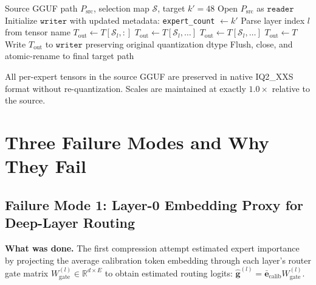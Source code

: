 \documentclass[final]{article}
\newcommand{\MAPLE}{\textsc{MAPLE}}
\newcommand{\R}{\mathbb{R}}
\begin{document}
\begin{algorithm}[H]
\caption{\MAPLE{} Container Assembly}
\begin{algorithmic}[1]
\Require Source GGUF path $P_\text{src}$, selection map $\mathcal{S}$, target $k' = 48$
\State Open $P_\text{src}$ as $\texttt{reader}$
\State Initialize $\texttt{writer}$ with updated metadata: \texttt{expert\_count} $\leftarrow k'$
  \State Parse layer index $l$ from tensor name
    \State $T_\text{out} \leftarrow T[\mathcal{S}_l, :]$ 
    \State $T_\text{out} \leftarrow T[\mathcal{S}_l, \ldots]$ 
    \State $T_\text{out} \leftarrow T[\mathcal{S}_l, \ldots]$ 
  \Else
    \State $T_\text{out} \leftarrow T$ 
  \EndIf
  \State Write $T_\text{out}$ to $\texttt{writer}$ preserving original quantization dtype
\EndFor
\State Flush, close, and atomic-rename to final target path
\end{algorithmic}
\end{algorithm}

All per-expert tensors in the source GGUF are preserved in native IQ2\_XXS format without re-quantization. Scales are maintained at exactly $1.0\times$ relative to the source.

\section{Three Failure Modes and Why They Fail}
\label{sec:failures}

\subsection{Failure Mode 1: Layer-0 Embedding Proxy for Deep-Layer Routing}

\textbf{What was done.} The first compression attempt estimated expert importance by projecting the average calibration token embedding through each layer's router gate matrix $W_\text{gate}^{(l)} \in \R^{d \times E}$ to obtain estimated routing logits: $\hat{\mathbf{g}}^{(l)} = \bar{\mathbf{e}}_\text{calib} W_\text{gate}^{(l)}$.
\end{document}
